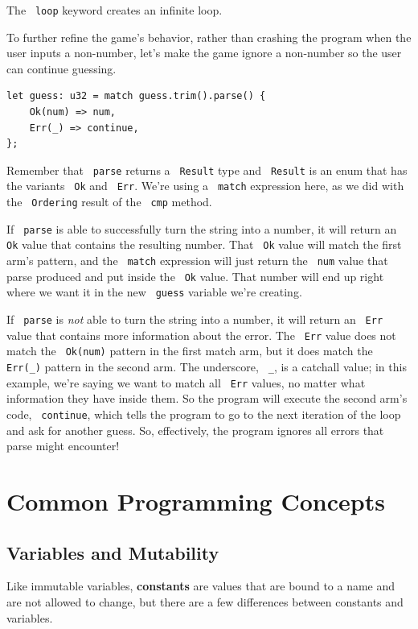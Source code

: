 \documentclass[11pt]{article}
\let\OldTexttt\texttt
\renewcommand{\texttt}[1]{\OldTexttt{\color{MidnightBlue} #1}}
\begin{document}
The \texttt{loop} keyword creates an infinite loop.

To further refine the game’s behavior, rather than crashing the program when the user inputs a
non-number, let’s make the game ignore a non-number so the user can continue guessing.

\begin{verbatim}
let guess: u32 = match guess.trim().parse() {
    Ok(num) => num,
    Err(_) => continue,
};  
\end{verbatim}

Remember that \texttt{parse} returns a \texttt{Result} type and \texttt{Result} is an enum that has the variants \texttt{Ok} and
\texttt{Err}. We’re using a \texttt{match} expression here, as we did with the \texttt{Ordering} result of the \texttt{cmp}
method.

If \texttt{parse} is able to successfully turn the string into a number, it will return an \texttt{Ok} value
that contains the resulting number. That \texttt{Ok} value will match the first arm’s pattern, and the
\texttt{match} expression will just return the \texttt{num} value that parse produced and put inside the \texttt{Ok}
value. That number will end up right where we want it in the new \texttt{guess} variable we’re
creating.

If \texttt{parse} is \emph{not} able to turn the string into a number, it will return an \texttt{Err} value that
contains more information about the error. The \texttt{Err} value does not match the \texttt{Ok(num)} pattern in
the first match arm, but it does match the \texttt{Err(\_)} pattern in the second arm. The underscore,
\texttt{\_}, is a catchall value; in this example, we’re saying we want to match all \texttt{Err} values, no
matter what information they have inside them. So the program will execute the second arm’s
code, \texttt{continue}, which tells the program to go to the next iteration of the loop and ask for
another guess. So, effectively, the program ignores all errors that parse might encounter!

\section{Common Programming Concepts}
\label{sec:orgc590b59}
\subsection{Variables and Mutability}
\label{sec:org99cf660}
Like immutable variables, \textbf{constants} are values that are bound to a name and are not allowed to
change, but there are a few differences between constants and variables.
\end{document}
